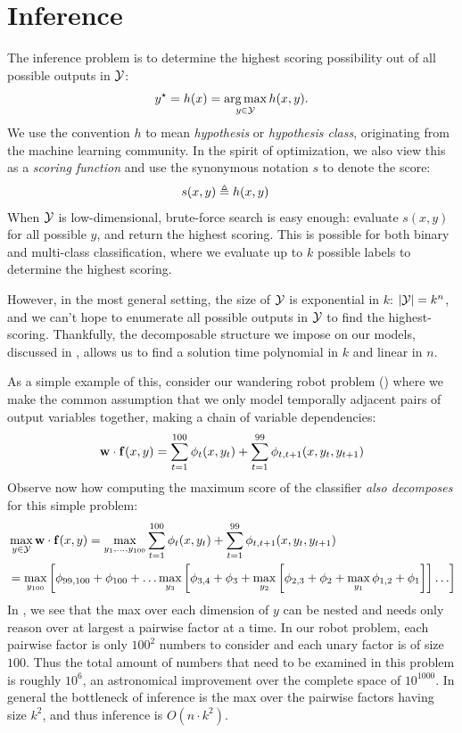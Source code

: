 \section{Inference}
\label{sec:inference}
The inference problem is to determine the highest scoring possibility out of 
all possible outputs in $\mathcal{Y}$: 
\begin{equation} 
y^\star = h(x) = \mathop{\arg\max}_{y \in \mathcal{Y}} h(x,y).  
\end{equation}
We use the convention $h$ to mean {\em hypothesis} or {\em hypothesis class}, originating from the machine learning community.  In the spirit of optimization, we also view this as a {\em scoring function} and use the synonymous notation $s$ to denote the score:
\begin{align} s(x,y) &\triangleq h(x,y) \end{align}
When $\mathcal{Y}$ is low-dimensional, brute-force search is easy enough: evaluate 
$s(x,y)$ for all possible $y$, and return the highest scoring.  This is 
possible for both binary and multi-class classification, where we evaluate up 
to $k$ possible labels to determine the highest scoring.

However, in the most general setting, the size of $\mathcal{Y}$ is exponential in $k$: 
$|\mathcal{Y}| = k^n$, and we can't hope to enumerate all possible outputs in $\mathcal{Y}$ to 
find the highest-scoring.  Thankfully, the decomposable structure we impose on 
our models, discussed in , allows us to find a solution time 
polynomial in $k$ and linear in $n$.
 

As a simple example of this, consider our wandering robot problem 
() where we make the common assumption that we only model 
temporally adjacent pairs of output variables together, making a chain of 
variable dependencies:
\begin{equation*}
\mathbf{w} \cdot \mathbf{f}(x,y) = \sum_{t=1}^{100} \phi_t(x,y_t) + \sum_{t=1}^{99} 
\phi_{t,t+1}(x,y_t,y_{t+1})
\end{equation*}
Observe now how computing the maximum score of the classifier {\em also 
decomposes} for this simple problem:
\begin{align}
&\max_{y \in \mathcal{Y}} \mathbf{w} \cdot \mathbf{f}(x,y) = \max_{y_1,\ldots,y_{100}} 
\sum_{t=1}^{100} \phi_t(x,y_t) + \sum_{t=1}^{99} \phi_{t,t+1}(x,y_t,y_{t+1}) \\
&= \max_{y_{100}} \left[ \phi_{99,100} + \phi_{100} + \ldots \max_{y_3} \left[\phi_{3,4} + \phi_3 +  \max_{y_2} \left[ \phi_{2,3} + \phi_2 + \max_{y_1} \phi_{1,2} + \phi_1 \right] \right] \ldots \right] 
\label{eq:nesting} \end{align} 
In , we see that the max over each dimension of $y$ can be
nested and needs only reason over at largest a pairwise factor at a time.  In 
our robot problem, each pairwise factor is only $100^2$ numbers to consider and 
each unary factor is of size $100$. Thus the total amount of numbers that need 
to be examined in this problem is roughly $10^6$, an astronomical improvement 
over the complete space of $10^{1000}$. In general the bottleneck of inference 
is the max over the pairwise factors having size $k^2$, and thus inference is 
$O(n \cdot k^2)$.

